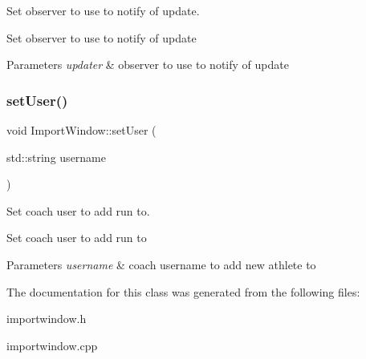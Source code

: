 Set observer to use to notify of update. 

Set observer to use to notify of update 
\begin{DoxyParams}{Parameters}
{\em updater} & observer to use to notify of update \\
\hline
\end{DoxyParams}
\mbox{\label{classImportWindow_afce7ddde4e07a6bdf9cf83fbc37ab5f3}} 
\subsubsection{\texorpdfstring{setUser()}{setUser()}}
{\footnotesize\ttfamily void Import\+Window\+::set\+User (\begin{DoxyParamCaption}\item[{std\+::string}]{username }\end{DoxyParamCaption})}



Set coach user to add run to. 

Set coach user to add run to 
\begin{DoxyParams}{Parameters}
{\em username} & coach username to add new athlete to \\
\hline
\end{DoxyParams}


The documentation for this class was generated from the following files\+:\begin{DoxyCompactItemize}
\item 
importwindow.\+h\item 
importwindow.\+cpp\end{DoxyCompactItemize}
